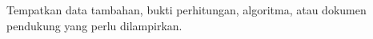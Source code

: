 Tempatkan data tambahan, bukti perhitungan, algoritma, atau dokumen pendukung yang perlu dilampirkan.
